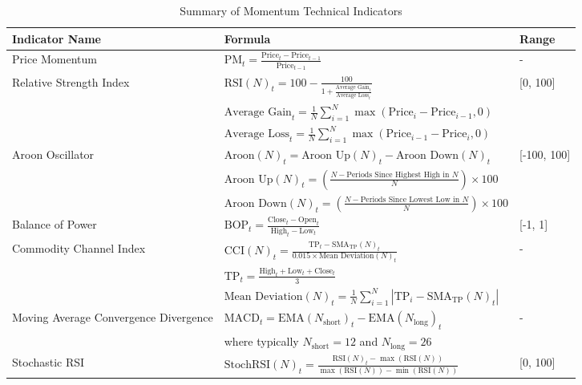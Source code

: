 \begin{table}[htb!]
\caption{Summary of Momentum Technical Indicators}
\label{Tables:MomentumIndicators}
\centering
\footnotesize
\begin{tabularx}{\textwidth}{@{}lXl@{}}
\toprule
\textbf{Indicator Name} & \textbf{Formula} & \textbf{Range} \\ 
\midrule
Price Momentum & $\text{PM}_t = \frac{\text{Price}_t - \text{Price}_{t-1}}{\text{Price}_{t-1}}$ & - \\
\addlinespace
Relative Strength Index & $\text{RSI}(N)_t = 100 - \frac{100}{1 + \frac{\text{Average Gain}_t}{\text{Average Loss}_t}}$ & [0, 100] \\
\addlinespace
& $\text{Average Gain}_t = \frac{1}{N}\sum_{i=1}^{N} \max(\text{Price}_i - \text{Price}_{i-1}, 0)$ & \\
\addlinespace
& $\text{Average Loss}_t = \frac{1}{N}\sum_{i=1}^{N} \max(\text{Price}_{i-1} - \text{Price}_i, 0)$ & \\
\addlinespace
Aroon Oscillator & $\text{Aroon}(N)_t = \text{Aroon Up}(N)_t - \text{Aroon Down}(N)_t$ & [-100, 100] \\
\addlinespace
& $\text{Aroon Up}(N)_t = \left( \frac{N - \text{Periods Since Highest High in } N}{N} \right) \times 100$ & \\
\addlinespace
& $\text{Aroon Down}(N)_t = \left( \frac{N - \text{Periods Since Lowest Low in } N}{N} \right) \times 100$ & \\
\addlinespace
Balance of Power & $\text{BOP}_t = \frac{\text{Close}_t - \text{Open}_t}{\text{High}_t - \text{Low}_t}$ & [-1, 1] \\
\addlinespace
Commodity Channel Index & $\text{CCI}(N)_t = \frac{\text{TP}_t - \text{SMA}_\text{TP}(N)_t}{0.015 \times \text{Mean Deviation}(N)_t}$ & - \\
\addlinespace
& $\text{TP}_t = \frac{\text{High}_t + \text{Low}_t + \text{Close}_t}{3}$ & \\
\addlinespace
& $\text{Mean Deviation}(N)_t = \frac{1}{N}\sum_{i=1}^{N} |\text{TP}_i - \text{SMA}_\text{TP}(N)_t|$ & \\
\addlinespace
Moving Average Convergence Divergence & $\text{MACD}_t = \text{EMA}(N_{\text{short}})_t - \text{EMA}(N_{\text{long}})_t $ & - \\
\addlinespace
& where typically $N_{\text{short}} = 12$ and $N_{\text{long}} = 26$ & \\
\addlinespace
Stochastic RSI & $\text{StochRSI}(N)_t = \frac{\text{RSI}(N)_t - \max(\text{RSI}(N))}{\max(\text{RSI}(N)) - \min(\text{RSI}(N))}$ & [0, 100] \\

\end{tabularx}
\end{table}
